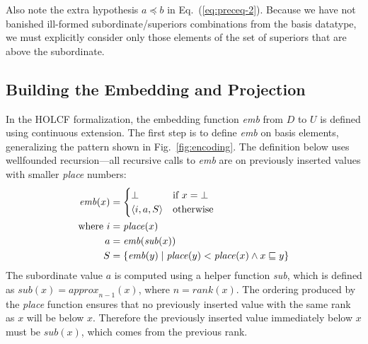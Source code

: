 \documentclass{llncs}
\begin{document}
Also note the extra hypothesis $a \preceq b$ in
Eq.~(\ref{eq:preceq-2}).  Because we have not banished ill-formed
subordinate/superiors combinations from the basis datatype, we must
explicitly consider only those elements of the set of superiors that
are above the subordinate.

\subsection {Building the Embedding and Projection}

In the HOLCF formalization, the embedding function \emph{emb} from $D$
to $U$ is defined using continuous extension.  The first step is to
define \emph{emb} on basis elements, generalizing the pattern shown in
Fig.~\ref{fig:encoding}.  The definition below uses wellfounded
recursion---all recursive calls to \emph{emb} are on previously
inserted values with smaller \emph{place} numbers:
\begin{align}
\mathit{emb}(x) & =
\begin{cases}
\bot & \mbox{if}~x = \bot \\
\langle i, a, S \rangle & \mbox{otherwise}
\end{cases} \notag \\
\mbox{where}~i & = \mathit{place}(x) \label{eq:emb} \\
a & = \mathit{emb}(\mathit{sub}(x)) \notag \\
S & = \{\mathit{emb}(y) \mid \mathit{place}(y) < \mathit{place}(x)
\wedge x \sqsubseteq y\} \notag
\end{align}
The subordinate value $a$ is computed using a helper function
\emph{sub}, which is defined as $\mathit{sub}(x) =
\mathit{approx}_{n-1}(x)$, where $n = \mathit{rank}(x)$.  The ordering
produced by the \emph{place} function ensures that no previously
inserted value with the same rank as $x$ will be below $x$.  Therefore
the previously inserted value immediately below $x$ must be
$\mathit{sub}(x)$, which comes from the previous rank.
\end{document}
